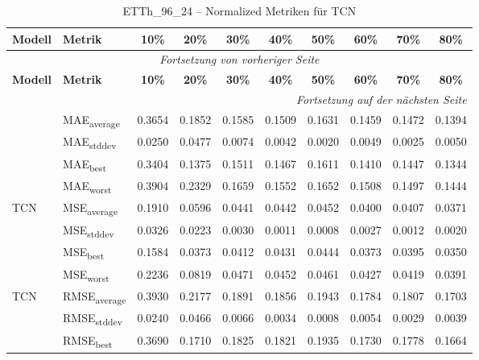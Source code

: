 {\small
\begin{longtable}{l l c c c c c c c c}
    \toprule
    \textbf{Modell} & \textbf{Metrik} & \textbf{10\%} & \textbf{20\%} & \textbf{30\%} & \textbf{40\%} & \textbf{50\%} & \textbf{60\%} & \textbf{70\%} & \textbf{80\%} \\
    \midrule
    \endfirsthead
    \multicolumn{10}{c}{\textit{Fortsetzung von vorheriger Seite}} \\
    \toprule
    \textbf{Modell} & \textbf{Metrik} & \textbf{10\%} & \textbf{20\%} & \textbf{30\%} & \textbf{40\%} & \textbf{50\%} & \textbf{60\%} & \textbf{70\%} & \textbf{80\%} \\
    \midrule
    \endhead
    \midrule
    \multicolumn{10}{r}{\textit{Fortsetzung auf der nächsten Seite}} \\
    \midrule
    \endfoot
    \bottomrule
    \caption{ETTh_96_24 -- Normalized Metriken für TCN}
    \label{tab:etth_96_24_normalized_tcn}
    \endlastfoot
\multirow{4}{*}{TCN} & MAE\textsubscript{average} & 0.3654 & 0.1852 & 0.1585 & 0.1509 & 0.1631 & 0.1459 & 0.1472 & 0.1394 \\
 & MAE\textsubscript{stddev} & 0.0250 & 0.0477 & 0.0074 & 0.0042 & 0.0020 & 0.0049 & 0.0025 & 0.0050 \\
 & MAE\textsubscript{best} & 0.3404 & 0.1375 & 0.1511 & 0.1467 & 0.1611 & 0.1410 & 0.1447 & 0.1344 \\
 & MAE\textsubscript{worst} & 0.3904 & 0.2329 & 0.1659 & 0.1552 & 0.1652 & 0.1508 & 0.1497 & 0.1444 \\
\cmidrule(lr){2-10}
\multirow{4}{*}{TCN} & MSE\textsubscript{average} & 0.1910 & 0.0596 & 0.0441 & 0.0442 & 0.0452 & 0.0400 & 0.0407 & 0.0371 \\
 & MSE\textsubscript{stddev} & 0.0326 & 0.0223 & 0.0030 & 0.0011 & 0.0008 & 0.0027 & 0.0012 & 0.0020 \\
 & MSE\textsubscript{best} & 0.1584 & 0.0373 & 0.0412 & 0.0431 & 0.0444 & 0.0373 & 0.0395 & 0.0350 \\
 & MSE\textsubscript{worst} & 0.2236 & 0.0819 & 0.0471 & 0.0452 & 0.0461 & 0.0427 & 0.0419 & 0.0391 \\
\cmidrule(lr){2-10}
\multirow{4}{*}{TCN} & RMSE\textsubscript{average} & 0.3930 & 0.2177 & 0.1891 & 0.1856 & 0.1943 & 0.1784 & 0.1807 & 0.1703 \\
 & RMSE\textsubscript{stddev} & 0.0240 & 0.0466 & 0.0066 & 0.0034 & 0.0008 & 0.0054 & 0.0029 & 0.0039 \\
 & RMSE\textsubscript{best} & 0.3690 & 0.1710 & 0.1825 & 0.1821 & 0.1935 & 0.1730 & 0.1778 & 0.1664 \\

\end{longtable}}
